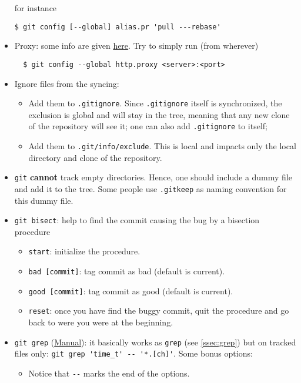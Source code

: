 \documentclass[a4paper,12pt,%
              final%
              ]{article}
\begin{document}
\begin{itemize}
\begin{verbatim}
\end{verbatim}
        for instance
\begin{verbatim}
$ git config [--global] alias.pr 'pull ---rebase'
\end{verbatim}
  \item Proxy: some info are given \href{https://gist.github.com/evantoli/f8c23a37eb3558ab8765}{here}. Try to simply run (from wherever)
\begin{verbatim}
  $ git config --global http.proxy <server>:<port>
\end{verbatim}
  \item Ignore files from the syncing:
    \begin{itemize}
      \item Add them to \texttt{.gitignore}. Since \texttt{.gitignore} itself is synchronized, the exclusion is global and will stay in the tree, meaning that any new clone of the repository will see it; one can also add \texttt{.gitignore} to itself;
      \item Add them to \texttt{.git/info/exclude}. This is local and impacts only the local directory and clone of the repository.
    \end{itemize}
  \item \texttt{git} \textbf{cannot} track empty directories. Hence, one should include a dummy file and add it to the tree. Some people use \verb|.gitkeep| as naming convention for this dummy file.
  \item \texttt{git bisect}: help to find the commit causing the bug by a bisection procedure
    \begin{itemize}
      \item \verb|start|: initialize the procedure.
      \item \verb|bad [commit]|: tag commit as bad (default is current).
      \item \verb|good [commit]|: tag commit as good (default is current).
      \item \verb|reset|: once you have find the buggy commit, quit the procedure and go back to were you were at the beginning.
    \end{itemize}
  \item \verb|git grep| (\href{https://git-scm.com/docs/git-grep}{Manual}): it basically works as \verb|grep| (see \autoref{ssec:grep}) but on tracked files only: \verb|git grep 'time_t' -- '*.[ch]'|. Some bonus options:
    \begin{itemize}
      \item Notice that \verb|--| marks the end of the options.

\end{itemize}
\end{itemize}
\end{document}

